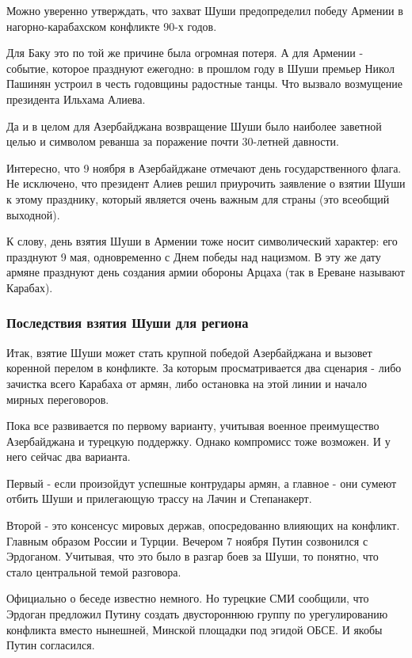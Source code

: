 Можно уверенно утверждать, что захват Шуши предопределил победу Армении в
нагорно-карабахском конфликте 90-х годов. 

Для Баку это по той же причине была огромная потеря. А для Армении - событие,
которое празднуют ежегодно: в прошлом году в Шуши премьер Никол Пашинян устроил
в честь годовщины радостные танцы. Что вызвало возмущение президента Ильхама
Алиева.

Да и в целом для Азербайджана возвращение Шуши было наиболее заветной целью и
символом реванша за поражение почти 30-летней давности.

Интересно, что 9 ноября в Азербайджане отмечают день государственного флага. Не
исключено, что президент Алиев решил приурочить заявление о взятии Шуши к этому
празднику, который является очень важным для страны (это всеобщий выходной).

К слову, день взятия Шуши в Армении тоже носит символический характер: его
празднуют 9 мая, одновременно с Днем победы над нацизмом. В эту же дату армяне
празднуют день создания армии обороны Арцаха (так в Ереване называют Карабах). 

\subsubsection{Последствия взятия Шуши для региона}

Итак, взятие Шуши может стать крупной победой Азербайджана и вызовет коренной
перелом в конфликте. За которым просматривается два сценария - либо зачистка
всего Карабаха от армян, либо остановка на этой линии и начало мирных
переговоров. 

Пока все развивается по первому варианту, учитывая военное преимущество
Азербайджана и турецкую поддержку. Однако компромисс тоже возможен. И у него
сейчас два варианта. 

Первый - если произойдут успешные контрудары армян, а главное - они сумеют
отбить Шуши и прилегающую трассу на Лачин и Степанакерт. 

Второй - это консенсус мировых держав, опосредованно влияющих на конфликт.
Главным образом России и Турции. Вечером 7 ноября Путин созвонился с Эрдоганом.
Учитывая, что это было в разгар боев за Шуши, то понятно, что стало центральной
темой разговора. 

Официально о беседе известно немного. Но турецкие СМИ сообщили, что Эрдоган
предложил Путину создать двустороннюю группу по урегулированию конфликта вместо
нынешней, Минской площадки под эгидой ОБСЕ. И якобы Путин согласился. 

